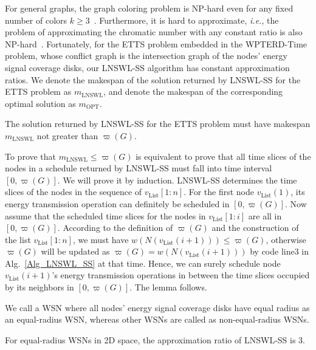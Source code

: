 \documentclass[journal,10pt]{IEEEtran}
\begin{document}
For general graphs, the graph coloring problem is NP-hard even for any fixed number of colors $k{\geq}3$~\cite{Garey1979}. Furthermore, it is hard to approximate, \textit{i.e.}, the problem of approximating the chromatic number with any constant ratio is also NP-hard~\cite{Arora1998}. Fortunately, for the ETTS problem embedded in the WPTERD-Time problem, whose conflict graph is the intersection graph of the nodes' energy signal coverage disks, our LNSWL-SS algorithm has constant approximation ratios. We denote the makespan of the solution returned by LNSWL-SS for the ETTS problem as $m_\text{LNSWL}$, and denote the makespan of the corresponding optimal solution as $m_\text{OPT}$.

\begin{lemma}
\label{lemma_valid_solution}
The solution returned by LNSWL-SS for the ETTS problem must have makespan $m_\text{LNSWL}$ not greater than $\varpi(G)$.
\end{lemma}

\begin{IEEEproof}
To prove that $m_\text{LNSWL}{\leq}\varpi(G)$ is equivalent to prove that all time slices of the nodes in a schedule returned by LNSWL-SS must fall into time interval $[0,\varpi(G)]$. We will prove it by induction. LNSWL-SS determines the time slices of the nodes in the sequence of $v_\text{List}[1{:}n]$. For the first node $v_\text{List}(1)$, its energy transmission operation can definitely be scheduled in $[0,\varpi(G)]$. Now assume that the scheduled time slices for the nodes in $v_\text{List}[1{:}i]$ are all in $[0,\varpi(G)]$. According to the definition of $\varpi(G)$ and the construction of the list $v_\text{List}[1{:}n]$, we must have $w(N(v_\text{List}(i{+}1))){\leq}\varpi(G)$, otherwise $\varpi(G)$ will be updated as $\varpi(G){=}w(N(v_\text{List}(i{+}1)))$ by code line3 in Alg.~\ref{Alg_LNSWL_SS} at that time. Hence, we can surely schedule node $v_\text{List}(i{+}1)$'s energy transmission operations in between the time slices occupied by its neighbors in $[0,\varpi(G)]$. The lemma follows.
\end{IEEEproof}

We call a WSN where all nodes' energy signal coverage disks have equal radius as an equal-radius WSN, whereas other WSNs are called as non-equal-radius WSNs.

\begin{lemma}
\label{lemma_2d_ratio3}
For equal-radius WSNs in 2D space, the approximation ratio of LNSWL-SS is 3.
\end{lemma}
\end{document}
